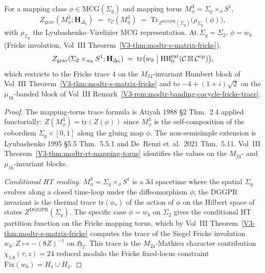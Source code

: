 \begin{theorem}
\label{thm:thqghr-rt-mapping-torus}
For a mapping class $\phi\in\mathrm{MCG}(\Sigma_g)$ and mapping torus
$M_\phi^3 = \Sigma_g\times_\phi S^1$,
\[
 Z_{\mathrm{grav}}(M_\phi^3; \mathbf H_{\Delta_5})
 \;=\;
 \tau_{\mathcal C}(M_\phi^3)
 \;=\;
 \mathrm{Tr}_{Z^{\mathrm{DGGPR}}(\Sigma_g)}\!\bigl(\rho_{\Sigma_g}(\phi)\bigr),
\]
with $\rho_{\Sigma_g}$ the Lyubashenko--Virelizier MCG representation.
At $\Sigma_g = \Sigma_2$, $\phi = w_8$ (Fricke involution, Vol~III
Theorem~\ref{V3-thm:modtr-s-matrix-fricke}),
\[
 Z_{\mathrm{grav}}(\Sigma_2\times_{w_8} S^1; \mathbf H_{\Delta_5})
 \;=\;
 \mathrm{tr}\bigl(w_8\bigm\vert
 \mathrm{HH}_0^{\mathrm{cat}}(\mathcal C\boxtimes\mathcal C^{\mathrm{op}})\bigr),
\]
which restricts to the Fricke trace $4$ on the $M_{24}$-invariant
Humbert block of Vol~III Theorem~\ref{V3-thm:modtr-s-matrix-fricke}
and to $-4 + (1+i)\sqrt 2$ on the $\mu_{16}$-banded block of Vol~III
Remark~\ref{V3-rem:modtr-banding-cocycle-fricke-trace}.
\end{theorem}

\begin{proof}
The mapping-torus trace formula is Atiyah 1988 \S 2 Thm.~2.4 applied
functorially: $Z(M_\phi^3) = \mathrm{tr}(Z(\phi))$ since $M_\phi^3$
is the self-composition of the cobordism $\Sigma_g\times [0, 1]$
along the gluing map $\phi$. The non-semisimple extension is
Lyubashenko 1995 \S 5.5 Thm.~5.5.1 and De~Renzi et~al.\ 2021 Thm.~5.11.
Vol~III Theorem~\ref{V3-thm:modtr-rt-mapping-torus} identifies the
values on the $M_{24}$- and $\mu_{16}$-invariant blocks.

\emph{Conditional HT reading.} $M_\phi^3 = \Sigma_g\times_\phi S^1$ is a
3d spacetime where the spatial $\Sigma_g$ evolves along a closed
time-loop under the diffeomorphism $\phi$; the DGGPR invariant
is the thermal trace $\mathrm{tr}(\phi_*)$ of the action of $\phi$ on
the Hilbert space of states $Z^{\mathrm{DGGPR}}(\Sigma_g)$. The
specific case $\phi = w_8$ on $\Sigma_2$ gives the conditional HT
partition function on the Fricke mapping torus, which by Vol~III
Theorem~\ref{V3-thm:modtr-s-matrix-fricke} computes the trace of the
Siegel Fricke involution $w_8\colon Z\mapsto-(8Z)^{-1}$ on
$\mathfrak H_2$. This trace is the $M_{24}$-Mathieu character
contribution $\chi_{1A}(\tau, z) = 24$ reduced modulo the Fricke
fixed-locus constraint $\mathrm{Fix}(w_8) = H_1\cup H_4$.
\end{proof}

